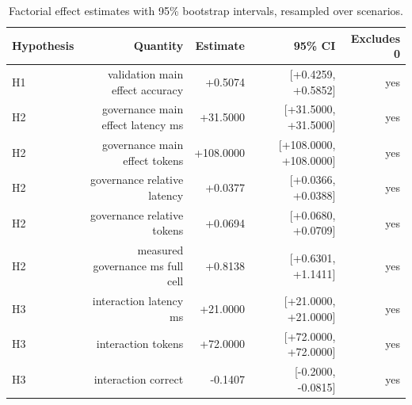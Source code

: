 \begin{table}[htbp]
\centering
\small
\caption{Factorial effect estimates with 95\% bootstrap intervals, resampled over scenarios.}
\label{tab:gmais-5}
\begin{tabular}{lrrrr}
\toprule
Hypothesis & Quantity & Estimate & 95\% CI & Excludes 0 \\
\midrule
H1 & validation main effect accuracy & +0.5074 & [+0.4259, +0.5852] & yes \\
H2 & governance main effect latency ms & +31.5000 & [+31.5000, +31.5000] & yes \\
H2 & governance main effect tokens & +108.0000 & [+108.0000, +108.0000] & yes \\
H2 & governance relative latency & +0.0377 & [+0.0366, +0.0388] & yes \\
H2 & governance relative tokens & +0.0694 & [+0.0680, +0.0709] & yes \\
H2 & measured governance ms full cell & +0.8138 & [+0.6301, +1.1411] & yes \\
H3 & interaction latency ms & +21.0000 & [+21.0000, +21.0000] & yes \\
H3 & interaction tokens & +72.0000 & [+72.0000, +72.0000] & yes \\
H3 & interaction correct & -0.1407 & [-0.2000, -0.0815] & yes \\
\bottomrule
\end{tabular}
\end{table}
